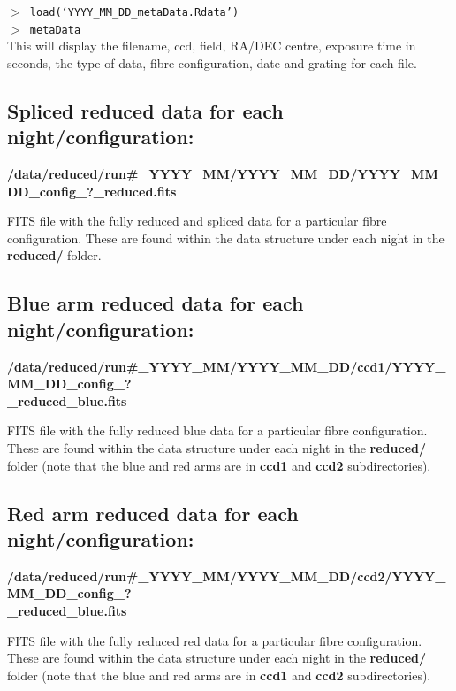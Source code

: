 \documentclass[12pt]{article}
\begin{document}
\hspace{10mm}  \texttt{$>$ load(`YYYY\_MM\_DD\_metaData.Rdata')}\\

\hspace{10mm}  \texttt{$>$ metaData}\\
  
 
 This will display the filename, ccd, field, RA/DEC centre, exposure time in seconds, the type of data, fibre configuration, date and grating for each file.  

 
\subsection{Spliced reduced data for each night/configuration:} 
 
 \textbf{/data/reduced/run\#\_YYYY\_MM/YYYY\_MM\_DD/YYYY\_MM\_DD\_config\_?\_reduced.fits} 
 
 FITS file with the fully reduced and spliced data for a particular fibre configuration. These are found within the data structure under each night in the \textbf{reduced/} folder. 

  
\subsection{Blue arm reduced data for each night/configuration:} 
   
   \textbf{/data/reduced/run\#\_YYYY\_MM/YYYY\_MM\_DD/ccd1/YYYY\_MM\_DD\_config\_? \\ \_reduced\_blue.fits} 
   
 FITS file with the fully reduced blue data for a particular fibre configuration. These are found within the data structure under each night in the \textbf{reduced/} folder (note that the blue and red arms are in \textbf{ccd1} and \textbf{ccd2} subdirectories). 

 
  
\subsection{Red arm reduced data for each night/configuration:} 
  
  \textbf{/data/reduced/run\#\_YYYY\_MM/YYYY\_MM\_DD/ccd2/YYYY\_MM\_DD\_config\_? \\ \_reduced\_blue.fits} 
  
  FITS file with the fully reduced red data for a particular fibre configuration. These are found within the data structure under each night in the \textbf{reduced/} folder (note that the blue and red arms are in \textbf{ccd1} and \textbf{ccd2} subdirectories). 
\end{document}

